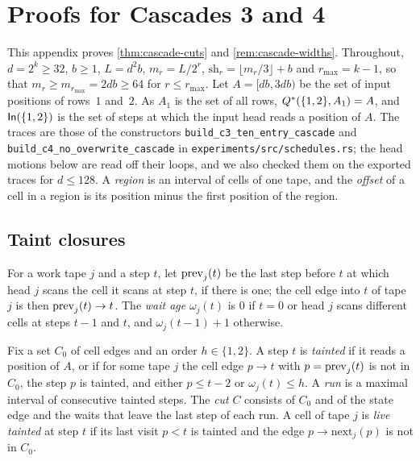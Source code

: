 \section{Proofs for Cascades 3 and 4}\label{app:cascade-cuts}

This appendix proves \cref{thm:cascade-cuts} and \cref{rem:cascade-widths}. Throughout, $d=2^k\ge32$, $b\ge1$, $L=d^2b$,
$m_r=L/2^r$, $\mathrm{sh}_r=\lfloor m_r/3\rfloor+b$ and $r_{\max}=k-1$, so that $m_r\ge m_{r_{\max}}=2db\ge64$ for $r\le r_{\max}$. Let
$A=[db,3db)$ be the set of input positions of rows~$1$ and~$2$. As $A_1$ is the set of all rows, $Q^{*}(\{1,2\},A_1)=A$, and
$\mathsf{In}(\{1,2\})$ is the set of steps at which the input head reads a position of $A$. The traces are those of the constructors
\texttt{build\_c3\_ten\_entry\_cascade} and \texttt{build\_c4\_no\_overwrite\_cascade} in \texttt{experiments/src/schedules.rs}; the head
motions below are read off their loops, and we also checked them on the exported traces for $d\le128$. A \emph{region} is an interval
of cells of one tape, and the \emph{offset} of a cell in a region is its position minus the first position of the region.

\subsection{Taint closures}

For a work tape $j$ and a step $t$, let $\mathrm{prev}_j(t)$ be the last step before $t$ at which head $j$ scans the cell it scans at step $t$,
if there is one; the cell edge into $t$ of tape $j$ is then $\mathrm{prev}_j(t)\to t$. The \emph{wait age} $\omega_j(t)$ is $0$ if $t=0$ or
head $j$ scans different cells at steps $t-1$ and $t$, and $\omega_j(t-1)+1$ otherwise.

\begin{definition}\label{def:taint}
Fix a set $C_0$ of cell edges and an order $h\in\{1,2\}$. A step $t$ is \emph{tainted} if it reads a position of $A$, or if for some
tape $j$ the cell edge $p\to t$ with $p=\mathrm{prev}_j(t)$ is not in $C_0$, the step $p$ is tainted, and either $p\le t-2$ or $\omega_j(t)\le h$.
A \emph{run} is a maximal interval of consecutive tainted steps. The \emph{cut} $C$ consists of $C_0$ and of the state edge and the
waits that leave the last step of each run. A cell of tape $j$ is \emph{live tainted} at step $t$ if its last visit $p<t$ is tainted and
the edge $p\to\mathrm{next}_j(p)$ is not in $C_0$.
\end{definition}

